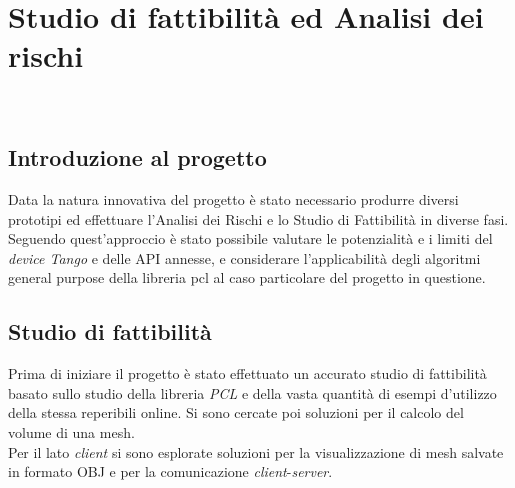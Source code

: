 
\chapter{Studio di fattibilità ed Analisi dei rischi}

\\

\section{Introduzione al progetto}

Data la natura innovativa del progetto è stato necessario produrre diversi prototipi ed
effettuare l’Analisi dei Rischi e lo Studio di Fattibilità in diverse fasi.
Seguendo quest'approccio è stato possibile valutare le potenzialità e i limiti del \emph{device Tango} e delle API annesse, e considerare l'applicabilità degli algoritmi general purpose della libreria \gls{pcl} al caso particolare del progetto in questione.

\section{Studio di fattibilità}
Prima di iniziare il progetto è stato effettuato un accurato studio di fattibilità basato sullo studio della libreria \emph{PCL} e della vasta quantità di esempi d'utilizzo della stessa reperibili online. Si sono cercate poi soluzioni per il calcolo del volume di una mesh.\\
Per il lato \emph{client} si sono esplorate soluzioni per la visualizzazione di mesh salvate in formato OBJ e per la comunicazione \emph{client}-\emph{server}.

